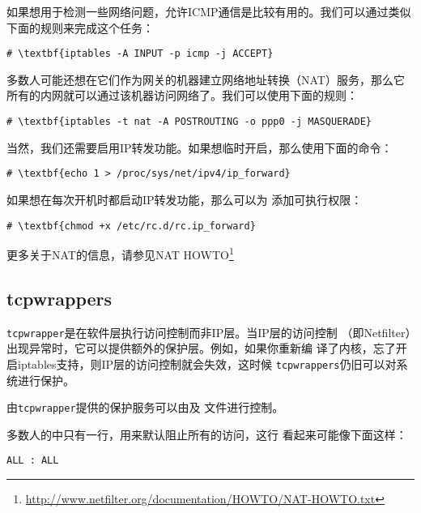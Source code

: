 如果想用于检测一些网络问题，允许ICMP通信是比较有用的。我们可以通过类似
下面的规则来完成这个任务：
\begin{Verbatim}[frame=single, commandchars=\\\{\}]
# \textbf{iptables -A INPUT -p icmp -j ACCEPT}
\end{Verbatim}

多数人可能还想在它们作为网关的机器建立网络地址转换（NAT）服务，那么它
所有的内网就可以通过该机器访问网络了。我们可以使用下面的规则：
\begin{Verbatim}[frame=single, commandchars=\\\{\}]
# \textbf{iptables -t nat -A POSTROUTING -o ppp0 -j MASQUERADE}
\end{Verbatim}

当然，我们还需要启用IP转发功能。如果想临时开启，那么使用下面的命令：
\begin{Verbatim}[frame=single, commandchars=\\\{\}]
  # \textbf{echo 1 > /proc/sys/net/ipv4/ip_forward}
\end{Verbatim}

如果想在每次开机时都启动IP转发功能，那么可以为
添加可执行权限：
\begin{Verbatim}[frame=single, commandchars=\\\{\}]
# \textbf{chmod +x /etc/rc.d/rc.ip_forward}
\end{Verbatim}

更多关于NAT的信息，请参见NAT
HOWTO\footnote{\url{http://www.netfilter.org/documentation/HOWTO/NAT-HOWTO.txt}}

\subsection{tcpwrappers}
\label{chap:security:hostAccessControl:tcpwrappers}
\texttt{tcpwrapper}是在软件层执行访问控制而非IP层。当IP层的访问控制
（即Netfilter）出现异常时，它可以提供额外的保护层。例如，如果你重新编
译了内核，忘了开启iptables支持，则IP层的访问控制就会失效，这时候
\texttt{tcpwrappers}仍旧可以对系统进行保护。

由\texttt{tcpwrapper}提供的保护服务可以由及
文件进行控制。

多数人的中只有一行，用来默认阻止所有的访问，这行
看起来可能像下面这样：
\begin{Verbatim}[frame=single, commandchars=\\\{\}]
ALL : ALL
\end{Verbatim}

